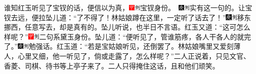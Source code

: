 谁知红玉听见了宝钗的话，便信以为真，{\includegraphics[width=3mm]{../Images/00002}\includegraphics[width=3mm]{../Images/00011}\footnotesize \kaishu 宝钗身份。　\includegraphics[width=3mm]{../Images/00004}\includegraphics[width=3mm]{../Images/00011}\footnotesize \kaishu 实有这一句的。}让宝钗去远，便拉坠儿道：``了不得了！林姑娘蹲在这里，一定听了话去了！''{\includegraphics[width=3mm]{../Images/00004}\includegraphics[width=3mm]{../Images/00011}\footnotesize \kaishu 移东挪西，任意写去，却是真有的。}坠儿听说，也半日不言语。红玉又道：``这可怎么样呢？''{\includegraphics[width=3mm]{../Images/00002}\includegraphics[width=3mm]{../Images/00011}\footnotesize \kaishu 二句系黛玉身份。}坠儿道：``便听见了，管谁筋疼，各人干各人的就完了。''{\includegraphics[width=3mm]{../Images/00004}\includegraphics[width=3mm]{../Images/00011}\footnotesize \kaishu 勉强话。}红玉道：``若是宝姑娘听见，还倒罢了。林姑娘嘴里又爱刻薄人，心里又细，他一听见了，倘或走露了，怎么样呢？''二人正说着，只见文官、香菱、司棋、待书等上亭子来了。二人只得掩住这话，且和他们顽笑。

